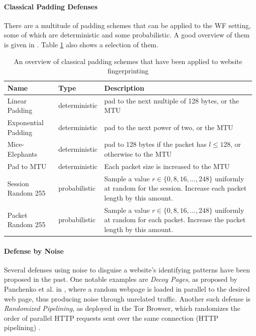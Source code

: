 \documentclass[
	ruledheaders=chapter,
	class=report,
	thesis={type=master, department=inf},
	accentcolor=1c,
	custommargins=true,
	marginpar=false,
	parskip=half-,
	fontsize=11pt,
]{tudapub}
\begin{document}
	\paragraph{Classical Padding Defenses} There are a multitude of padding schemes that can be applied to the WF setting, some of which are deterministic and some probabilistic. A good overview of them is given in \cite{Dyer2012}. Table \ref{tbl:padding} also shows a selection of them.
	
	\begin{table}
		\centering
		\small
		\begin{tabularx}{\textwidth}{|l|l|X|}
			\hline \textbf{Name} & \textbf{Type} & \textbf{Description} \\
			\hline Linear Padding & deterministic & pad to the next multiple of 128 bytes, or the MTU \\
			\hline Exponential Padding & deterministic & pad to the next power of two, or the MTU \\
			\hline Mice-Elephants & deterministic & pad to 128 bytes if the packet has $l \leq 128$, or otherwise to the MTU \\
			\hline Pad to MTU & deterministic & Each packet size is increased to the MTU \\
			\hline 
			\hline Session Random 255 & probabilistic & Sample a value $r \in \{0, 8, 16, ..., 248\}$ uniformly at random for the session. Increase each packet length by this amount. \\
			\hline Packet Random 255 & probabilistic & Sample a value $r \in \{0, 8, 16, ..., 248\}$ uniformly at random for each packet. Increase the packet length by this amount. \\
			\hline
		\end{tabularx}
		\caption{An overview of classical padding schemes that have been applied to website fingerprinting \cite{Dyer2012}}
		\label{tbl:padding}
	\end{table}

	\paragraph{Defense by Noise} Several defenses using noise to disguise a website's identifying patterns have been proposed in the past. One notable examples are \textit{Decoy Pages}, as proposed by Panchenko et al. in \cite{Panchenko2011}, where a random webpage is loaded in parallel to the desired web page, thus producing noise through unrelated traffic. Another such defense is \textit{Randomized Pipelining}, as deployed in the Tor Browser, which randomizes the order of parallel HTTP requests sent over the same connection (HTTP pipelining) \cite{Perry2011,Cherubin2017}.
	
\end{document}
